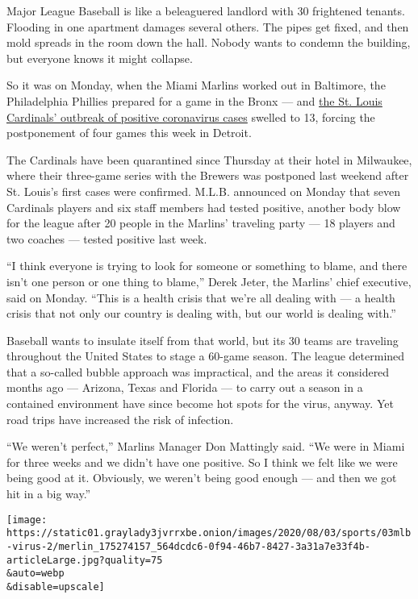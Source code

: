 Major League Baseball is like a beleaguered landlord with 30 frightened
tenants. Flooding in one apartment damages several others. The pipes get
fixed, and then mold spreads in the room down the hall. Nobody wants to
condemn the building, but everyone knows it might collapse.

So it was on Monday, when the Miami Marlins worked out in Baltimore, the
Philadelphia Phillies prepared for a game in the Bronx --- and
\href{https://www.nytimes3xbfgragh.onion/2020/08/01/sports/baseball/coronavirus-cardinals.html}{the
St. Louis Cardinals' outbreak of positive coronavirus cases} swelled to
13, forcing the postponement of four games this week in Detroit.

The Cardinals have been quarantined since Thursday at their hotel in
Milwaukee, where their three-game series with the Brewers was postponed
last weekend after St. Louis's first cases were confirmed. M.L.B.
announced on Monday that seven Cardinals players and six staff members
had tested positive, another body blow for the league after 20 people in
the Marlins' traveling party --- 18 players and two coaches --- tested
positive last week.

``I think everyone is trying to look for someone or something to blame,
and there isn't one person or one thing to blame,'' Derek Jeter, the
Marlins' chief executive, said on Monday. ``This is a health crisis that
we're all dealing with --- a health crisis that not only our country is
dealing with, but our world is dealing with.''

Baseball wants to insulate itself from that world, but its 30 teams are
traveling throughout the United States to stage a 60-game season. The
league determined that a so-called bubble approach was impractical, and
the areas it considered months ago --- Arizona, Texas and Florida --- to
carry out a season in a contained environment have since become hot
spots for the virus, anyway. Yet road trips have increased the risk of
infection.

``We weren't perfect,'' Marlins Manager Don Mattingly said. ``We were in
Miami for three weeks and we didn't have one positive. So I think we
felt like we were being good at it. Obviously, we weren't being good
enough --- and then we got hit in a big way.''

\texttt{[image: https://static01.graylady3jvrrxbe.onion/images/2020/08/03/sports/03mlb-virus-2/merlin\_175274157\_564dcdc6-0f94-46b7-8427-3a31a7e33f4b-articleLarge.jpg?quality=75\\\&auto=webp\\\&disable=upscale]}


